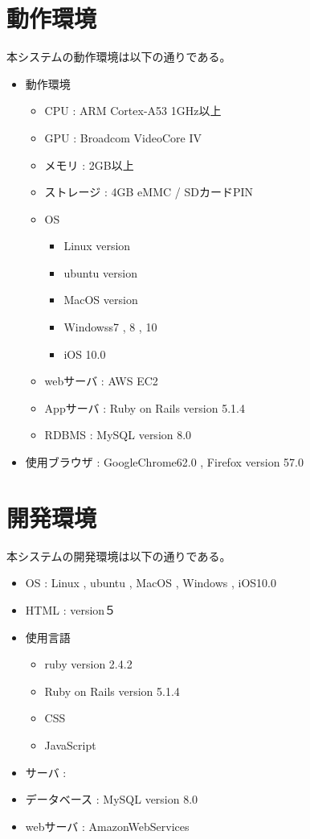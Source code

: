 \documentclass[a4j]{jarticle}
\begin{document}
 \section{動作環境}
本システムの動作環境は以下の通りである。
\begin{itemize}
\item 動作環境
	\begin{itemize}
	\item CPU : ARM Cortex-A53 1GHz以上
	\item GPU : Broadcom VideoCore IV
	\item メモリ : 2GB以上
	\item ストレージ : 4GB eMMC / SDカードPIN
	\item OS
	\begin{itemize}
		\item Linux version
		\item ubuntu version
		\item MacOS version
		\item Windowss7 , 8 , 10
		\item iOS 10.0
	\end{itemize}
	\item webサーバ : AWS EC2
	\item Appサーバ : Ruby on Rails version 5.1.4
	\item RDBMS : MySQL version 8.0
	\end{itemize}
\item 使用ブラウザ : GoogleChrome62.0 , Firefox version 57.0%
\end{itemize}
\section{開発環境}
本システムの開発環境は以下の通りである。
\begin{itemize}
\item OS : Linux , ubuntu , MacOS , Windows , iOS10.0
\item HTML : version５
\item 使用言語
	\begin{itemize}
	\item ruby version 2.4.2
	\item Ruby on Rails version 5.1.4
	\item CSS
	\item JavaScript
	\end{itemize}
\item サーバ :
\item データベース : MySQL version 8.0
\item webサーバ : AmazonWebServices
\end{itemize}
\end{document}
